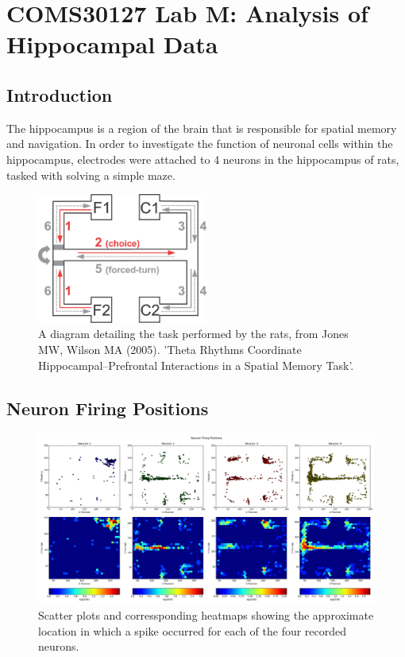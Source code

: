\documentclass[a4paper, 10pt]{article}
\begin{document}
\section*{COMS30127 Lab M: Analysis of Hippocampal Data}

\subsection*{Introduction}
The hippocampus is a region of the brain that is responsible for spatial memory
and navigation. In order to investigate the function of neuronal cells within
the hippocampus, electrodes were attached to 4 neurons in the hippocampus of
rats, tasked with solving a simple maze.

\begin{figure}[H]
  \centering
  \includegraphics[width=0.5\textwidth]{rat_maze.png}
  \caption{A diagram detailing the task performed by the rats, from Jones MW, Wilson MA (2005). 'Theta Rhythms Coordinate Hippocampal–Prefrontal Interactions in a Spatial Memory Task'.}
  \label{fig:maze}
\end{figure}

\subsection*{Neuron Firing Positions}
\begin{figure}[H]
  \centering
  \includegraphics[width=1.0\textwidth]{neuron_pos_plot.png}
  \caption{Scatter plots and corressponding heatmaps showing the approximate location in which a spike occurred for each of the four recorded neurons.}
  \label{fig:posplot}
\end{figure}
\end{document}
